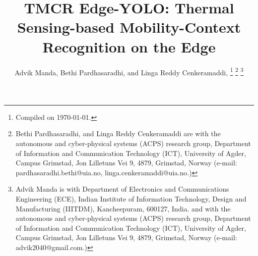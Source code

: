 \documentclass[journal,twoside,web]{ieeecolor}
\begin{document}
\title{TMCR Edge-YOLO: Thermal Sensing-based Mobility-Context Recognition on the Edge}

\author{Advik Manda, Bethi Pardhasaradhi, %
and Linga Reddy Cenkeramaddi, 
\thanks{Compiled on \today. 
}
\thanks{Bethi Pardhasaradhi, and Linga Reddy Cenkeramaddi are with the autonomous and cyber-physical systems (ACPS) research group, Department of Information and Communication Technology (ICT), University of Agder, Campus Grimstad, Jon Lilletuns Vei 9, 4879, Grimstad, Norway (e-mail: pardhasaradhi.bethi@uia.no, linga.cenkeramaddi@uia.no.) }
\thanks{Advik Manda is with Department of Electronics and Communications Engineering (ECE), Indian Institute of Information Technology, Design and Manufacturing (IIITDM), Kancheepuram, 600127, India. and with the autonomous and cyber-physical systems (ACPS) research group, Department of Information and Communication Technology (ICT), University of Agder, Campus Grimstad, Jon Lilletuns Vei 9, 4879, Grimstad, Norway (e-mail: advik2040@gmail.com.)}
}
\end{document}

